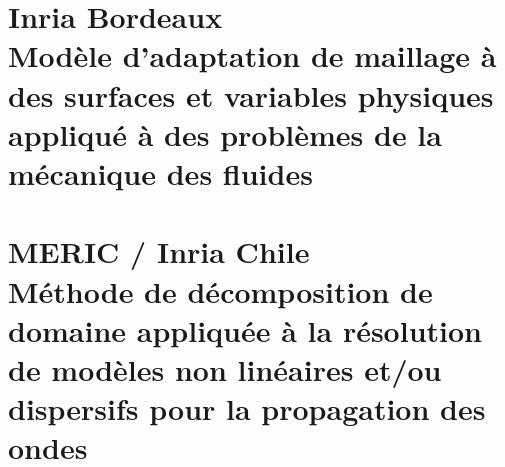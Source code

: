 \documentclass[12pt,a4paper,twoside]{article}
\author{Joao Guilherme Caldas Steinstraesser}
\begin{document}

\thispagestyle{empty}


\cleardoublepage


\cleardoublepage
\tableofcontents


\cleardoublepage

\cleardoublepage

\cleardoublepage

\cleardoublepage


\cleardoublepage
\vspace*{\fill}
\part{Inria Bordeaux\\Modèle d'adaptation de maillage à des surfaces et variables physiques appliqué à des problèmes de la mécanique des fluides}
\vspace*{\fill}

\cleardoublepage


 
 
 
 
 

\cleardoublepage
\vspace*{\fill}
\part{MERIC / Inria Chile\\Méthode de décomposition de domaine appliquée à la résolution de modèles non linéaires et/ou dispersifs pour la propagation des ondes}
\vspace*{\fill}

\cleardoublepage









\cleardoublepage

\cleardoublepage

\end{document}
